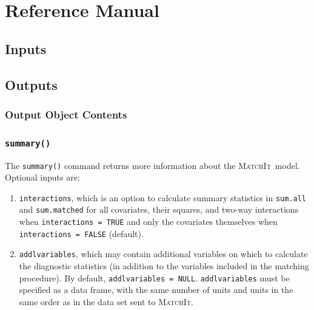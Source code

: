 \documentclass[oneside,letterpaper,titlepage]{article}
\newcommand{\MatchIt}{\textsc{MatchIt}}
\begin{document}



\section{Reference Manual}
\label{sec:reference}

\subsection{Inputs}
\label{subsec:inputs}




\subsection{Outputs}
\label{subsec:outputs}

\subsubsection{Output Object Contents}



\subsubsection{{\tt summary()}}
The \texttt{summary()} command returns more information about the
\MatchIt\ model.  Optional inputs are:

\begin{enumerate}
\item \texttt{interactions}, which is an option to calculate summary
  statistics in \texttt{sum.all} and \texttt{sum.matched} for all
  covariates, their squares, and two-way interactions when
  \texttt{interactions = TRUE} and only the covariates themselves when
  \texttt{interactions = FALSE} (default).
\item \texttt{addlvariables}, which may contain additional variables
  on which to calculate the diagnostic statistics (in addition to the
  variables included in the matching procedure).  By default,
  \texttt{addlvariables = NULL}.  \texttt{addlvariables} must be
  specified as a data frame, with the same number of units and units
  in the same order as in the data set sent to \MatchIt .
\end{enumerate}
\end{document}
